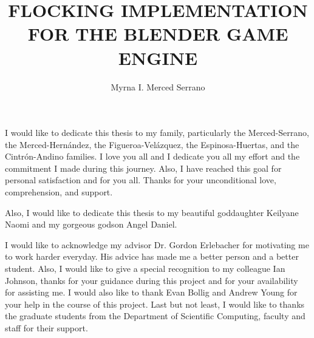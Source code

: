 \documentclass[11pt]{fsuthesis}
\title{FLOCKING IMPLEMENTATION FOR THE BLENDER GAME ENGINE}
\author{Myrna I. Merced Serrano}
\begin{document}
\frontmatter
\maketitle
\makesignaturepage

\begin{dedication}
I would like to dedicate this thesis to my family, particularly the Merced-Serrano, the Merced-Hern\'{a}ndez, the Figueroa-Vel\'{a}zquez, the Espinosa-Huertas, and the Cintr\'{o}n-Andino families. I love you all and I dedicate you all my effort and the commitment I made during this journey. Also, I have reached this goal for personal satisfaction and for you all. Thanks for your unconditional love, comprehension, and support. 

Also, I would like to dedicate this thesis to my beautiful goddaughter Keilyane Naomi and my gorgeous godson Angel Daniel.

\end{dedication}

\begin{acknowledgments}
I would like to acknowledge my advisor Dr. Gordon Erlebacher for motivating me to work harder everyday. His advice has made me a better person and a better student. Also, I would like to give a special recognition to my colleague Ian Johnson, thanks for your guidance during this project and for your availability for assisting me. I would also like to thank Evan Bollig and Andrew Young for your help in the course of this project. Last but not least, I would like to thanks the graduate students from the Department of Scientific Computing, faculty and staff for their support.
\end{acknowledgments}

\tableofcontents
\listoftables
\listoffigures



\onehalfspacing
\end{document}
